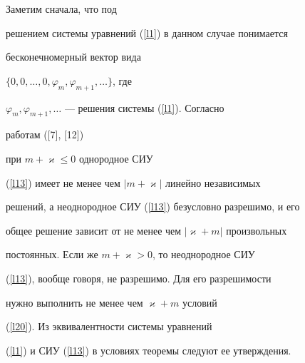 \begin{pf}


Заметим сначала, что под


решением системы уравнений (\ref{l1}) в данном случае понимается


бесконечномерный вектор вида


$\{0,0,\dotsc,0,\varphi_m,\varphi_{m+1},\dotsc\}$, где


$\varphi_m,\varphi_{m+1},\dotsc$ --- решения системы (\ref{l1}). Согласно


работам ([7], [12])


при $m+\varkappa\leqslant0$ однородное СИУ


(\ref{l13}) имеет не менее чем $|m+\varkappa|$ линейно независимых


решений, а неоднородное СИУ (\ref{l13}) безусловно разрешимо, и его


общее решение зависит от не менее чем $|\varkappa+m|$ произвольных


постоянных. Если же $m+\varkappa > 0$, то неоднородное СИУ


(\ref{l13}), вообще говоря, не разрешимо. Для его разрешимости


нужно выполнить не менее чем $\varkappa+m$ условий 


(\ref{l20}). Из эквивалентности системы уравнений


(\ref{l1}) и СИУ (\ref{l13}) в условиях теоремы следуют ее утверждения.


\end{pf}








